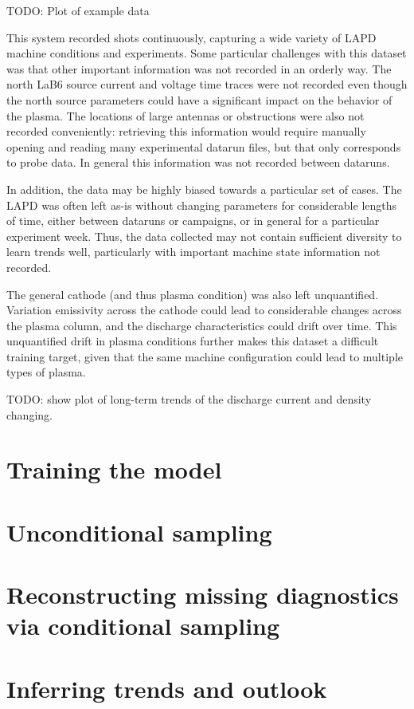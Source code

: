 TODO: Plot of example data

This system recorded shots continuously, capturing a wide variety of LAPD machine conditions and experiments. Some particular challenges with this dataset was that other important information was not recorded in an orderly way. The north LaB6 source current and voltage time traces were not recorded even though the north source parameters could have a significant impact on the behavior of the plasma. The locations of large antennas or obstructions were also not recorded conveniently: retrieving this information would require manually opening and reading many experimental datarun files, but that only corresponds to probe data. In general this information was not recorded between dataruns. 

In addition, the data may be highly biased towards a particular set of cases. The LAPD was often left as-is without changing parameters for considerable lengths of time, either between dataruns or campaigns, or in general for a particular experiment week. Thus, the data collected may not contain sufficient diversity to learn trends well, particularly with important machine state information not recorded.

The general cathode (and thus plasma condition) was also left unquantified. Variation emissivity across the cathode could lead to considerable changes across the plasma column, and the discharge characteristics could drift over time. This unquantified drift in plasma conditions further makes this dataset a difficult training target, given that the same machine configuration could lead to multiple types of plasma.

TODO: show plot of long-term trends of the discharge current and density changing.

\section{Training the model}

\section{Unconditional sampling}

\section{Reconstructing missing diagnostics via conditional sampling}

\section{Inferring trends and outlook}